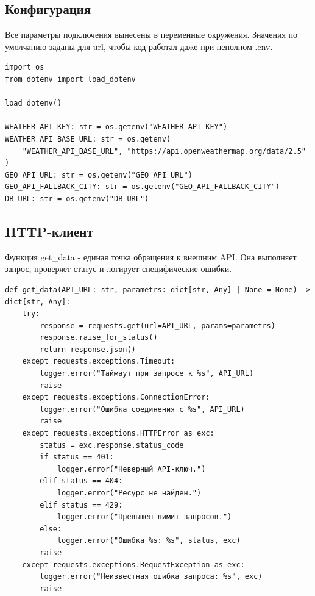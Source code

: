 \documentclass[oneside,a4paper,14pt]{extarticle}
\begin{document}
\subsection*{Конфигурация}
Все параметры подключения вынесены в переменные окружения. Значения по умолчанию заданы для url, чтобы код работал даже при неполном .env.

\begin{small}
	\begin{verbatim}
import os
from dotenv import load_dotenv

load_dotenv()

WEATHER_API_KEY: str = os.getenv("WEATHER_API_KEY")
WEATHER_API_BASE_URL: str = os.getenv(
    "WEATHER_API_BASE_URL", "https://api.openweathermap.org/data/2.5"
)
GEO_API_URL: str = os.getenv("GEO_API_URL")
GEO_API_FALLBACK_CITY: str = os.getenv("GEO_API_FALLBACK_CITY")
DB_URL: str = os.getenv("DB_URL")
\end{verbatim}
\end{small}

\subsection*{HTTP-клиент}
Функция get\_data - единая точка обращения к внешним API. Она выполняет запрос, проверяет статус и логирует специфические ошибки.

\begin{small}
	\begin{verbatim}
def get_data(API_URL: str, parametrs: dict[str, Any] | None = None) -> dict[str, Any]:
    try:
        response = requests.get(url=API_URL, params=parametrs)
        response.raise_for_status()
        return response.json()
    except requests.exceptions.Timeout:
        logger.error("Таймаут при запросе к %s", API_URL)
        raise
    except requests.exceptions.ConnectionError:
        logger.error("Ошибка соединения с %s", API_URL)
        raise
    except requests.exceptions.HTTPError as exc:
        status = exc.response.status_code
        if status == 401:
            logger.error("Неверный API-ключ.")
        elif status == 404:
            logger.error("Ресурс не найден.")
        elif status == 429:
            logger.error("Превышен лимит запросов.")
        else:
            logger.error("Ошибка %s: %s", status, exc)
        raise
    except requests.exceptions.RequestException as exc:
        logger.error("Неизвестная ошибка запроса: %s", exc)
        raise
\end{verbatim}
\end{small}
\end{document}
